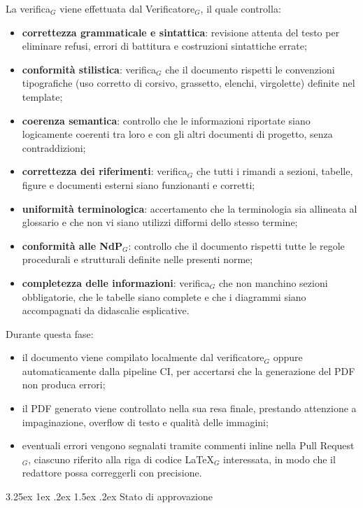 \documentclass[a4paper, 10pt]{article}
\makeatletter
\renewcommand\paragraph{\@startsection{paragraph}{4}{\z@}%
  {3.25ex \@plus1ex \@minus .2ex}%
  {1.5ex \@plus .2ex}%
  {\normalfont\normalsize\bfseries}}
\makeatother
\begin{document}
La verifica$_G$ viene effettuata dal Verificatore$_G$, il quale controlla:
\begin{itemize}
    \item \textbf{correttezza grammaticale e sintattica}: revisione attenta del testo per eliminare refusi, errori di battitura e costruzioni sintattiche errate;
    \item \textbf{conformità stilistica}: verifica$_G$ che il documento rispetti le convenzioni tipografiche (uso corretto di corsivo, grassetto, elenchi, virgolette) definite nel template;
    \item \textbf{coerenza semantica}: controllo che le informazioni riportate siano logicamente coerenti tra loro e con gli altri documenti di progetto, senza contraddizioni;
    \item \textbf{correttezza dei riferimenti}: verifica$_G$ che tutti i rimandi a sezioni, tabelle, figure e documenti esterni siano funzionanti e corretti;
    \item \textbf{uniformità terminologica}: accertamento che la terminologia sia allineata al glossario e che non vi siano utilizzi difformi dello stesso termine;
    \item \textbf{conformità alle NdP$_G$}: controllo che il documento rispetti tutte le regole procedurali e strutturali definite nelle presenti norme;
    \item \textbf{completezza delle informazioni}: verifica$_G$ che non manchino sezioni obbligatorie, che le tabelle siano complete e che i diagrammi siano accompagnati da didascalie esplicative.
\end{itemize}

Durante questa fase:
\begin{itemize}
    \item il documento viene compilato localmente dal verificatore$_G$ oppure automaticamente dalla pipeline CI, per accertarsi che la generazione del PDF non produca errori;
    \item il PDF generato viene controllato nella sua resa finale, prestando attenzione a impaginazione, overflow di testo e qualità delle immagini;
    \item eventuali errori vengono segnalati tramite commenti inline nella Pull Request$_G$, ciascuno riferito alla riga di codice \LaTeX$_G$ interessata, in modo che il redattore possa correggerli con precisione.
\end{itemize}

\paragraph{Stato di approvazione}
\end{document}
